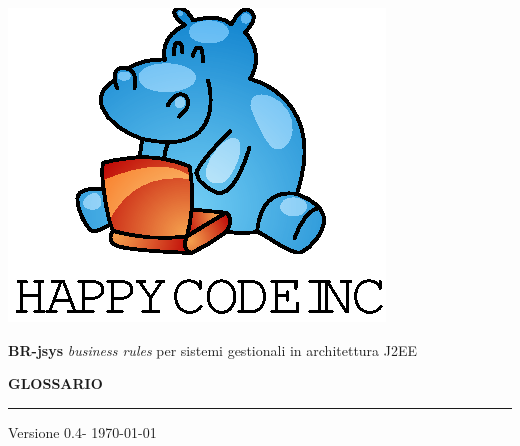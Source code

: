 \documentclass[11pt,titlepage,a4paper]{report}
\begin{document}
\newcommand{\lv}{0.4} %




\begin{titlepage}
\begin{center}
\vspace*{0.5in}
\includegraphics{logo.eps}
\vspace*{0.2in}

{\Large \textbf{BR-jsys}}
{\Large \emph{business rules} per sistemi gestionali in architettura J2EE } 
\vspace{2in}

\LARGE \textbf {GLOSSARIO}
\par\rule{10cm}{0.4pt} \par {\large Versione \lv - \today}


\end{center}
\end{titlepage}
\vspace*{0.5in}
\end{document}
